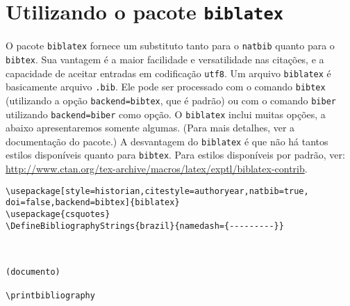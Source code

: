 \section{Utilizando o pacote \texttt{biblatex}}


O pacote \texttt{biblatex} fornece um substituto tanto para o \texttt{natbib} quanto para o \texttt{bibtex}. Sua vantagem é a maior facilidade e versatilidade nas citações, e a capacidade de aceitar entradas em codificação \texttt{utf8}. Um arquivo \texttt{biblatex} é basicamente arquivo \texttt{.bib}. Ele pode ser processado com o comando \texttt{bibtex} (utilizando a opção \texttt{backend=bibtex}, que é padrão) ou com o comando \texttt{biber} utilizando \texttt{backend=biber} como opção. O \texttt{biblatex} inclui muitas opções, a abaixo apresentaremos somente algumas. (Para mais detalhes, ver a documentação do pacote.) A desvantagem do \texttt{biblatex} é que não há tantos estilos disponíveis quanto para \texttt{bibtex}. Para estilos disponíveis por padrão, ver: \url{http://www.ctan.org/tex-archive/macros/latex/exptl/biblatex-contrib}.


\begin{verbatim}
\usepackage[style=historian,citestyle=authoryear,natbib=true,
doi=false,backend=bibtex]{biblatex}
\usepackage{csquotes}
\DefineBibliographyStrings{brazil}{namedash={---------}}



(documento)

\printbibliography



\end{verbatim}

